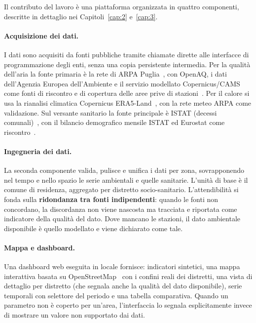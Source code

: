 Il contributo del lavoro è una piattaforma organizzata in quattro componenti, descritte in dettaglio nei Capitoli~\ref{cap:2} e~\ref{cap:3}.

\paragraph{Acquisizione dei dati.}
I dati sono acquisiti da fonti pubbliche tramite chiamate dirette alle interfacce di programmazione degli enti, senza una copia persistente intermedia. Per la qualità dell'aria la fonte primaria è la rete di ARPA Puglia~\cite{arpa_puglia_api}, con OpenAQ, i dati dell'Agenzia Europea dell'Ambiente e il servizio modellato Copernicus/CAMS come fonti di riscontro e di copertura delle aree prive di stazioni~\cite{openaq,eea_aqds,cams_reanalisi,cams_previsioni}. Per il calore si usa la rianalisi climatica Copernicus ERA5-Land~\cite{era5_land}, con la rete meteo ARPA come validazione. Sul versante sanitario la fonte principale è ISTAT (decessi comunali)~\cite{istat_dati_mortalita}, con il bilancio demografico mensile ISTAT ed Eurostat come riscontro~\cite{istat_bilancio_mensile,eurostat_decessi_settimanali}.

\paragraph{Ingegneria dei dati.}
La seconda componente valida, pulisce e unifica i dati per zona, sovrapponendo nel tempo e nello spazio le serie ambientali e quelle sanitarie. L'unità di base è il comune di residenza, aggregato per distretto socio-sanitario. L'attendibilità si fonda sulla \textbf{ridondanza tra fonti indipendenti}: quando le fonti non concordano, la discordanza non viene nascosta ma tracciata e riportata come indicatore della qualità del dato. Dove mancano le stazioni, il dato ambientale disponibile è quello modellato e viene dichiarato come tale.

\paragraph{Mappa e dashboard.}
Una dashboard web eseguita in locale fornisce: indicatori sintetici, una mappa interattiva basata su OpenStreetMap~\cite{osm_copyright} con i confini reali dei distretti, una vista di dettaglio per distretto (che segnala anche la qualità del dato disponibile), serie temporali con selettore del periodo e una tabella comparativa. Quando un parametro non è coperto per un'area, l'interfaccia lo segnala esplicitamente invece di mostrare un valore non supportato dai dati.

